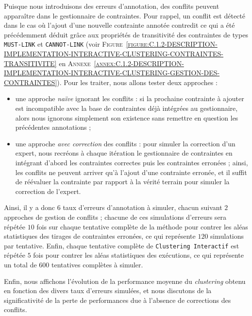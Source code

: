 			Puisque nous introduisons des erreurs d'annotation, des conflits peuvent apparaître dans le gestionnaire de contraintes.
			Pour rappel, un conflit est détecté dans le cas où l'ajout d'une nouvelle contrainte annotée contredit ce qui a été précédemment déduit grâce aux propriétés de transitivité des contraintes de types \texttt{MUST-LINK} et \texttt{CANNOT-LINK} (voir \textsc{Figure~\ref{figure:C.1.2-DESCRIPTION-IMPLEMENTATION-INTERACTIVE-CLUSTERING-CONTRAINTES-TRANSITIVITE}} en \textsc{Annexe~\ref{annex:C.1.2-DESCRIPTION-IMPLEMENTATION-INTERACTIVE-CLUSTERING-GESTION-DES-CONTRAINTES}}).
			Pour les traiter, nous allons tester deux approches :
			\begin{itemize}
				\item une approche \textit{naïve} ignorant les conflits : si la prochaine contrainte à ajouter est incompatible avec la base de contraintes déjà intégrées au gestionnaire, alors nous ignorons simplement son existence sans remettre en question les précédentes annotations ;
				\item une approche \textit{avec correction} des conflits : pour simuler la correction d'un expert, nous recréons à chaque itération le gestionnaire de contraintes en intégrant d'abord les contraintes correctes puis les contraintes erronées ; ainsi, les conflits ne peuvent arriver qu'à l'ajout d'une contrainte erronée, et il suffit de réévaluer la contrainte par rapport à la vérité terrain pour simuler la correction de l'expert.
			\end{itemize}
			
			Ainsi, il y a donc $6$ taux d'erreurs d'annotation à simuler, chacun suivant $2$ approches de gestion de conflits ; chacune de ces simulations d'erreurs sera répétée $10$ fois sur chaque tentative complète de la méthode pour contrer les aléas statistiques des tirages de contraintes erronées, ce qui représente $120$ simulations par tentative.
			Enfin, chaque tentative complète de \texttt{Clustering Interactif} est répétée $5$ fois pour contrer les aléas statistiques des exécutions, ce qui représente un total de $600$ tentatives complètes à simuler.

			Enfin, nous affichons l'évolution de la performance moyenne du \textit{clustering} obtenu en fonction des divers taux d'erreurs simulées, et nous discutons de la significativité de la perte de performances due à l'absence de corrections des conflits.
			

